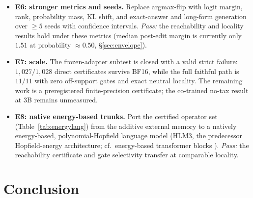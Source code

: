 \documentclass[11pt]{article}
\theoremstyle{remark}
\begin{document}
\begin{itemize}
  \citep{hartvigsen2023grace, wang2024wise, gu2026ultraedit}.
  \emph{Pass:} others-intact $\ge0.99$ with exact tombstone and rollback.
  \item \textbf{E6: stronger metrics and seeds.} Replace argmax-flip with logit
  margin, rank, probability mass, KL shift, and exact-answer and long-form
  generation \citep{rosati2024leme} over $\ge5$
  seeds with confidence intervals. \emph{Pass:} the reachability and locality
  results hold under these metrics (median post-edit margin is currently only
  $1.51$ at probability $\approx0.50$, \S\ref{sec:envelope}).
  \item \textbf{E7: scale.} The frozen-adapter subtest is closed with a valid
  strict failure: $1{,}027/1{,}028$ direct certificates survive BF16, while the
  full faithful path is $11/11$ with zero off-support gates and exact neutral
  locality. The remaining work is a preregistered finite-precision certificate;
  the co-trained no-tax result at $3$B remains unmeasured.
  \item \textbf{E8: native energy-based trunks.} Port the certified operator set
  (Table~\ref{tab:energylang}) from the additive external memory to a natively
  energy-based, polynomial-Hopfield language model (HLM3, the predecessor
  Hopfield-energy architecture; cf.\ energy-based
  transformer blocks \citep{hoover2023energy}). \emph{Pass:} the
  reachability certificate and gate selectivity transfer at comparable locality.
\end{itemize}

\section{Conclusion}
\end{document}
